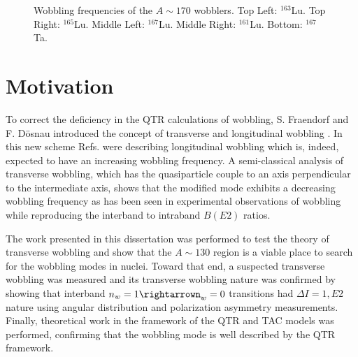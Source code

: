 \begin{figure}[ht!]
	\caption{Wobbling frequencies of the $A\sim{}170$ wobblers. Top Left: $^{163}$Lu. Top Right: $^{165}$Lu. Middle Left: $^{167}$Lu. Middle Right: $^{161}$Lu. Bottom: $^{167}$Ta.\label{fig:chp1-old-wobb-freq}}
\end{figure}

\section{Motivation}
\label{ssec:intro-rot-motivation}
To correct the deficiency in the QTR calculations of wobbling, S. Fraendorf and F. D\"{o}snau introduced the concept of transverse and longitudinal wobbling \cite{frauendorfTransverseWobbling}. In this new scheme Refs. \cite{oldQTRWobblingTheory1,oldQTRWobblingTheory2,oldQTRWobblingTheory3,oldQTRWobblingTheory4} were describing longitudinal wobbling which is, indeed, expected to have an increasing wobbling frequency. A semi-classical analysis of transverse wobbling, which has the quasiparticle couple to an axis perpendicular to the intermediate axis, shows that the modified mode exhibits a decreasing wobbling frequency as has been seen in experimental observations of wobbling while reproducing the interband to intraband $B(E2)$ ratios.

The work presented in this dissertation was performed to test the theory of transverse wobbling and show that the $A\sim{}130$ region is a viable place to search for the wobbling modes in nuclei. Toward that end, a suspected transverse wobbling was measured \pr{} and its transverse wobbling nature was confirmed by showing that interband $n_w=1\rightarrown_w=0$ transitions had $\Delta{}I=1, E2$ nature using angular distribution and polarization asymmetry measurements. Finally, theoretical work in the framework of the QTR and TAC models was performed, confirming that the wobbling mode is well described by the QTR framework.
